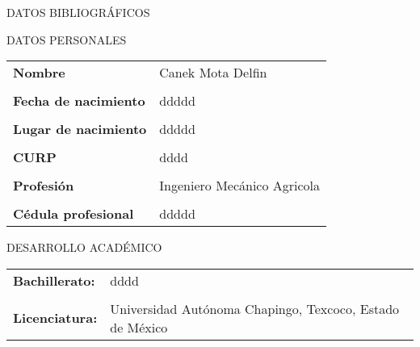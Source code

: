 \begin{large}
	\begin{center}
		DATOS BIBLIOGRÁFICOS
	\end{center}

\end{large}

\vspace{2cm}
\begin{large}
	\begin{center}
		DATOS PERSONALES
	\end{center}
\end{large}


\begin{center}
	\begin{tabular}{p{5cm} p{7cm}}
		
		\textbf{Nombre} & Canek Mota Delfin \\
		\\
		\textbf{Fecha de nacimiento} & ddddd \\
		\\
		\textbf{Lugar de nacimiento} & ddddd \\
		\\
		\textbf{CURP} & dddd \\
		\\
		\textbf{Profesión} & Ingeniero Mecánico Agricola \\
		\\
		\textbf{Cédula profesional} & ddddd \\
		
	\end{tabular}

\end{center}
\vspace{.5cm}
\begin{large}
	\begin{center}
		DESARROLLO ACADÉMICO
	\end{center}

\end{large}


\begin{center}
	\begin{tabular}{p{5cm} p{7cm}}
		
		\textbf{Bachillerato:} & dddd  \\
		\\
		\textbf{Licenciatura:} & Universidad Autónoma Chapingo, Texcoco, Estado de México\\
	
		
	\end{tabular}
	
\end{center}